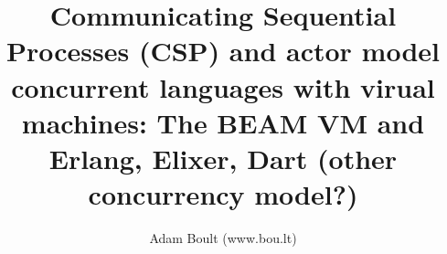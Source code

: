 \documentclass[oneside]{book}
\begin{document}
\author{Adam Boult (www.bou.lt)}
\title{Communicating Sequential Processes (CSP) and actor model concurrent languages with virual machines: The BEAM VM and Erlang, Elixer, Dart (other concurrency model?)}
\maketitle

\setcounter{tocdepth}{0}
\tableofcontents


\end{document}
